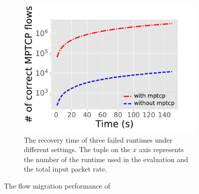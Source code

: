\begin{figure}[!ht]
   \begin{subfigure}[t]{0.33\linewidth}
  \centering
    \includegraphics[width=\columnwidth]{figure/MPTCP.pdf}
    \caption{The recovery time of three failed runtimes under different settings. The tuple on the $x$ axis represents the number of the runtime used in the evaluation and the total input packet rate. }\label{fig:rep-recovery} \end{subfigure}
 \caption{The flow migration performance of \nfactor}
\label{fig:rep-perf}
\end{figure}
